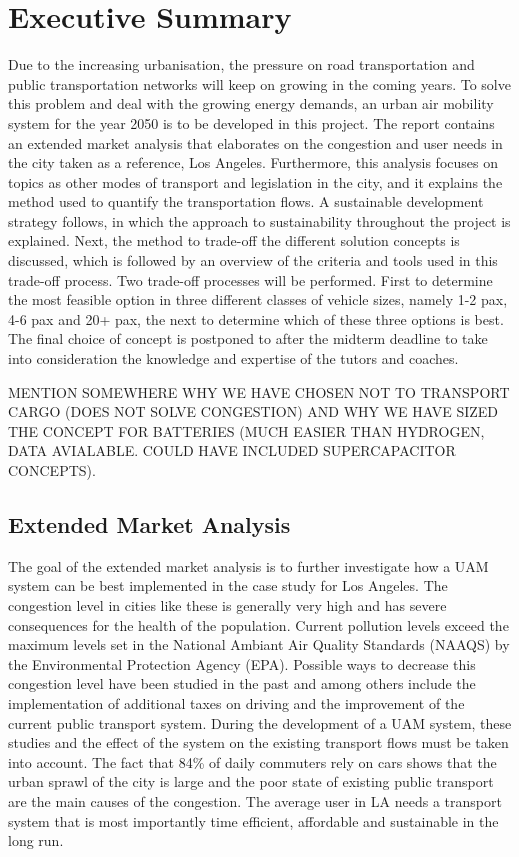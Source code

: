 \newpage
\chapter{Executive Summary}
\label{ch-ES}

Due to the increasing urbanisation, the pressure on road transportation and public transportation networks will keep on growing in the coming years. To solve this problem and deal with the growing energy demands, an urban air mobility system for the year 2050 is to be developed in this project. The report contains an extended market analysis that elaborates on the congestion and user needs in the city taken as a reference, Los Angeles. Furthermore, this analysis focuses on topics as other modes of transport and legislation in the city, and it explains the method used to quantify the transportation flows. A sustainable development strategy follows, in which the approach to sustainability throughout the project is explained. Next, the method to trade-off the different solution concepts is discussed, which is followed by an overview of the criteria and tools used in this trade-off process. Two trade-off processes will be performed. First to determine the most feasible option in three different classes of vehicle sizes, namely 1-2 pax, 4-6 pax and 20+ pax, the next to determine which of these three options is best. The final choice of concept is postponed to after the midterm deadline to take into consideration the knowledge and expertise of the tutors and coaches. 

MENTION SOMEWHERE WHY WE HAVE CHOSEN NOT TO TRANSPORT CARGO (DOES NOT SOLVE CONGESTION) AND WHY WE HAVE SIZED THE CONCEPT FOR BATTERIES (MUCH EASIER THAN HYDROGEN, DATA AVIALABLE. COULD HAVE INCLUDED SUPERCAPACITOR CONCEPTS).

\section{Extended Market Analysis}
The goal of the extended market analysis is to further investigate how a UAM system can be best implemented in the case study for Los Angeles. The congestion level in cities like these is generally very high and has severe consequences for the health of the population. Current pollution levels exceed the maximum levels set in the National Ambiant Air Quality Standards (NAAQS) by the Environmental Protection Agency (EPA). Possible ways to decrease this congestion level have been studied in the past and among others include the implementation of additional taxes on driving and the improvement of the current public transport system. During the development of a UAM system, these studies and the effect of the system on the existing transport flows must be taken into account. The fact that 84\% of daily commuters rely on cars shows that the urban sprawl of the city is large and the poor state of existing public transport are the main causes of the congestion. The average user in LA needs a transport system that is most importantly time efficient, affordable and sustainable in the long run. 

